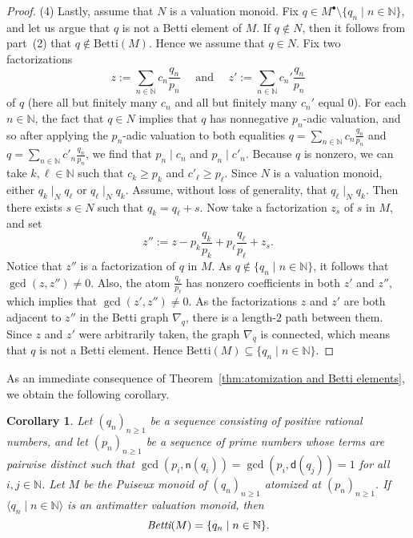 \documentclass[12pt]{amsart}
\newtheorem{cor}[theorem]{Corollary}
\theoremstyle{definition}
\numberwithin{equation}{section}
\newcommand{\nn}{\mathbb{N}}
\begin{document}
\begin{proof}
	(4) Lastly, assume that $N$ is a valuation monoid. Fix $q \in M^\bullet \setminus \{q_n \mid n \in \mathbb{N}\}$, and let us argue that $q$ is not a Betti element of $M$. If $q \notin N$, then it follows from part~(2) that $q \notin \text{Betti}(M)$. Hence we assume that $q \in N$. %
	Fix two factorizations
	\[
		z := \sum_{n \in \mathbb{N}} c_n\frac{q_n}{p_n} \quad \text{ and } \quad z' := \sum_{n \in \mathbb{N}} c_n'\frac{q_n}{p_n}
	\]
	of $q$ (here all but finitely many $c_n$ and all but finitely many $c_n'$ equal $0$). For each $n \in \nn$, the fact that $q \in N$ implies that $q$ has nonnegative $p_n$-adic valuation, and so after applying the $p_n$-adic valuation to both equalities $q = \sum_{n \in \mathbb{N}} c_n\frac{q_n}{p_n}$ and $q= \sum_{n \in \mathbb{N}} c'_n\frac{q_n}{p_n}$, we find that $p_n \mid c_n$ and $p_n \mid c'_n$. Because $q$ is nonzero, we can take $k,\ell \in \mathbb{N}$ such that $c_k \geq p_k$ and $c'_\ell \geq p_\ell$. Since $N$ is a valuation monoid, either $q_k \mid_N q_\ell$ or $q_\ell \mid_N q_k$. Assume, without loss of generality, that $q_\ell \mid_N q_k$. Then there exists $s \in N$ such that $q_k = q_\ell + s$. Now take a factorization $z_s$ of $s$ in $M$, and set
	\[
		z'' := z - p_k\frac{q_k}{p_k} + p_\ell\frac{q_\ell}{p_\ell} + z_s.
	\]
	Notice that $z''$ is a factorization of $q$ in $M$. As $q \not \in \{q_n \mid n \in \mathbb{N}\}$, it follows that $\gcd(z, z'') \neq 0$.  Also, the atom $\frac{q_\ell}{p_\ell}$ has nonzero coefficients in both $z'$ and $z''$, which implies that $\gcd(z', z'') \neq 0$. As the factorizations $z$ and $z'$ are both adjacent to $z''$ in the Betti graph $\nabla_q$, there is a length-$2$ path between them. Since $z$ and $z'$ were arbitrarily taken, the graph $\nabla_q$ is connected, which means that $q$ is not a Betti element. Hence $\text{Betti}(M) \subseteq \{q_n \mid n \in \mathbb{N}\}$.
\end{proof}

As an immediate consequence of Theorem~\ref{thm:atomization and Betti elements}, we obtain the following corollary.

\begin{cor} \label{cor:Betti elements of atomized PM}
	Let $(q_n)_{n \ge 1}$ be a sequence consisting of positive rational numbers, and let $(p_n)_{n \ge 1}$ be a sequence of prime numbers whose terms are pairwise distinct such that $\gcd(p_i, \mathsf{n}(q_i)) = \gcd(p_i, \mathsf{d}(q_j)) = 1$ for all $i,j \in \nn$. Let $M$ be the Puiseux monoid of $(q_n)_{n \ge 1}$ atomized at $(p_n)_{n \ge 1}$. If $\langle q_n \mid n \in \nn \rangle$ is an antimatter valuation monoid, then
	\[
		\emph{Betti}(M) = \{q_n \mid n \in \nn\}.
	\]
\end{cor}
\end{document}

